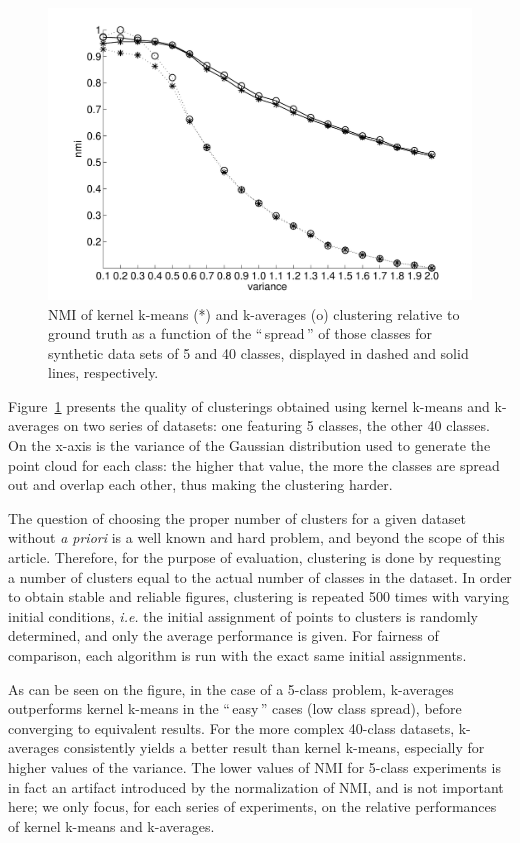 \documentclass[natbib,smallextended]{svjour3}
\newcommand{\gl}[1]{``\,#1\,''} %
\begin{document}
\begin{figure}
\center
\includegraphics[width=.7\textwidth]{figures/synthetic.pdf}
\caption{NMI of kernel k-means (*) and k-averages (o) clustering relative to ground truth as a function of the \gl{spread} of those classes for synthetic data sets of 5 and 40 classes, displayed in dashed and solid lines, respectively.}
\label{fig:synth_perf}
\end{figure}

Figure~\ref{fig:synth_perf} presents the quality of clusterings obtained using kernel k-means and k-averages on two series of datasets: one featuring 5 classes, the other 40 classes. On the x-axis is the variance of the Gaussian distribution used to generate the point cloud for each class: the higher that value, the more the classes are spread out and overlap each other, thus making the clustering harder.

The question of choosing the proper number of clusters for a given dataset without \textit{a priori} is a well known and hard problem, and beyond the scope of this article. Therefore, for the purpose of evaluation, clustering is done by requesting a number of clusters equal to the actual number of classes in the dataset. In order to obtain stable and reliable figures, clustering is repeated 500 times with varying initial conditions, \textit{i.e.} the initial assignment of points to clusters is randomly determined, and only the average performance is given. For fairness of comparison, each algorithm is run with the exact same initial assignments.

As can be seen on the figure, in the case of a 5-class problem, k-averages outperforms kernel k-means in the \gl{easy} cases (low class spread), before converging to equivalent results. For the more complex 40-class datasets, k-averages consistently yields a better result than kernel k-means, especially for higher values of the variance. The lower values of NMI for 5-class experiments is in fact an artifact introduced by the normalization of NMI, and is not important here; we only focus, for each series of experiments, on the relative performances of kernel k-means and k-averages.
\end{document}
